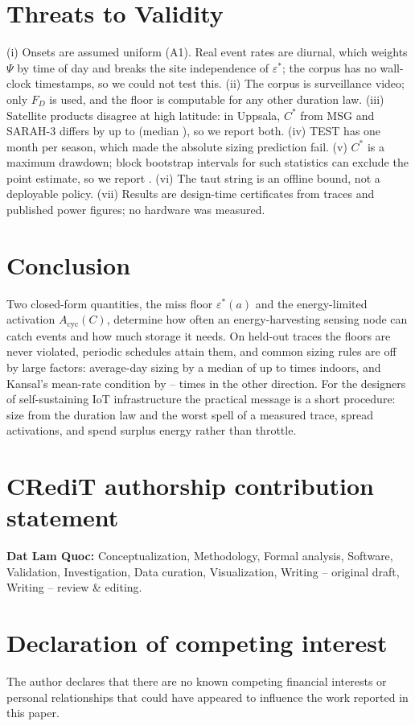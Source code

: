 \documentclass[final,5p,times,twocolumn]{elsarticle}
\theoremstyle{definition}
\theoremstyle{remark}
\newcommand{\eps}{\varepsilon}
\newcommand{\Psif}{\Psi}
\begin{document}
\section{Threats to Validity}\label{sec:threats}
(i) Onsets are assumed uniform (A1). Real event rates are diurnal, which weights $\Psif$ by time of day and breaks the site independence of $\eps^*$; the corpus has no wall-clock timestamps, so we could not test this. (ii) The corpus is surveillance video; only $F_D$ is used, and the floor is computable for any other duration law. (iii) Satellite products disagree at high latitude: in Uppsala, $C^*$ from MSG and SARAH-3 differs by up to \uppProdDiffMax{} (median \uppProdDiffMed), so we report both. (iv) TEST has one month per season, which made the absolute sizing prediction fail. (v) $C^*$ is a maximum drawdown; block bootstrap intervals for such statistics can exclude the point estimate, so we report \blockNote. (vi) The taut string is an offline bound, not a deployable policy. (vii) Results are design-time certificates from traces and published power figures; no hardware was measured.

\section{Conclusion}\label{sec:conclusion}
Two closed-form quantities, the miss floor $\eps^*(a)$ and the energy-limited activation $A_{\mathrm{cyc}}(C)$, determine how often an energy-harvesting sensing node can catch events and how much storage it needs. On held-out traces the floors are never violated, periodic schedules attain them, and common sizing rules are off by large factors: average-day sizing by a median of up to \avgIn{} times indoors, and Kansal's mean-rate condition by \kmeanInvLo--\kmeanInvHi{} times in the other direction. For the designers of self-sustaining IoT infrastructure the practical message is a short procedure: size from the duration law and the worst spell of a measured trace, spread activations, and spend surplus energy rather than throttle.

\section*{CRediT authorship contribution statement}
\textbf{Dat Lam Quoc:} Conceptualization, Methodology, Formal analysis, Software, Validation, Investigation, Data curation, Visualization, Writing -- original draft, Writing -- review \& editing.

\section*{Declaration of competing interest}
The author declares that there are no known competing financial interests or personal relationships that could have appeared to influence the work reported in this paper.
\end{document}
